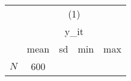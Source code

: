 {
\def\sym#1{\ifmmode^{#1}\else\(^{#1}\)\fi}
\begin{tabular}{l*{1}{cccc}}
\hline\hline
            &\multicolumn{4}{c}{(1)}                            \\
            &\multicolumn{4}{c}{y\_it}                           \\
            &        mean&          sd&         min&         max\\
\hline
\hline
\(N\)       &         600&            &            &            \\
\hline\hline
\end{tabular}
}
